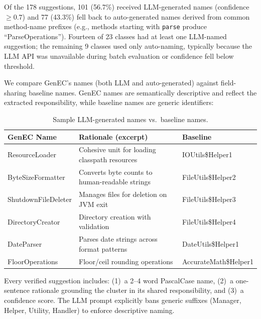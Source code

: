 \documentclass[sigconf]{acmart}
\begin{document}
Of the 178 suggestions, 101 (56.7\%) received LLM-generated names (confidence
$\geq 0.7$) and 77 (43.3\%) fell back to auto-generated names derived from
common method-name prefixes (e.g., methods starting with \texttt{parse} produce
``ParseOperations''). Fourteen of 23 classes had at least one LLM-named
suggestion; the remaining 9 classes used only auto-naming, typically because the
LLM API was unavailable during batch evaluation or confidence fell below
threshold.

We compare GenEC's names (both LLM and auto-generated) against field-sharing
baseline names. GenEC names are semantically descriptive and
reflect the extracted responsibility, while baseline names are generic
identifiers:

\begin{table}[t]
\centering\small
\caption{Sample LLM-generated names vs.\ baseline names.}
\label{tab:rq3}
\begin{tabularx}{\columnwidth}{@{}lXl@{}}
\toprule
\textbf{GenEC Name} & \textbf{Rationale (excerpt)} & \textbf{Baseline} \\
\midrule
ResourceLoader      & Cohesive unit for loading classpath resources & IOUtils\$Helper1 \\
ByteSizeFormatter   & Converts byte counts to human-readable strings & FileUtils\$Helper2 \\
ShutdownFileDeleter & Manages files for deletion on JVM exit & FileUtils\$Helper3 \\
DirectoryCreator    & Directory creation with validation & FileUtils\$Helper4 \\
DateParser          & Parses date strings across format patterns & DateUtils\$Helper1 \\
FloorOperations & Floor/ceil rounding operations & AccurateMath\$Helper1 \\
\bottomrule
\end{tabularx}
\end{table}

Every verified suggestion includes: (1)~a 2--4 word PascalCase name, (2)~a
one-sentence rationale grounding the cluster in its shared responsibility, and
(3)~a confidence score. The LLM prompt explicitly bans generic suffixes
(Manager, Helper, Utility, Handler) to enforce descriptive naming.
\end{document}
